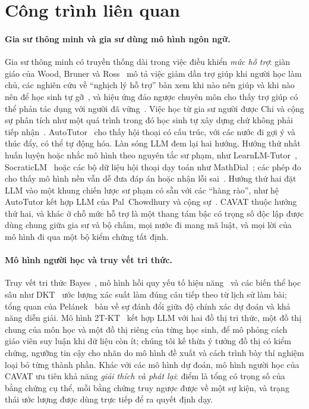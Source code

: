 \section{Công trình liên quan}\label{sec:related}

\paragraph{Gia sư thông minh và gia sư dùng mô hình ngôn ngữ.}
Gia sư thông minh có truyền thống dài trong việc điều khiển \emph{mức hỗ trợ}: giàn giáo của Wood, Bruner và Ross~\cite{wood1976} mô tả việc giảm dần trợ giúp khi người học làm chủ, các nghiên cứu về ``nghịch lý hỗ trợ'' bàn xem khi nào nên giúp và khi nào nên để học sinh tự gỡ~\cite{koedinger2007,aleven2016}, và hiệu ứng đảo ngược chuyên môn cho thấy trợ giúp có thể phản tác dụng với người đã vững~\cite{kalyuga2003}. Việc học từ gia sư người được Chi và cộng sự phân tích như một quá trình trong đó học sinh tự xây dựng chứ không phải tiếp nhận~\cite{chi2001}. AutoTutor~\cite{graesser2005} cho thấy hội thoại có cấu trúc, với các nước đi gợi ý và thúc đẩy, có thể tự động hóa. Làn sóng LLM đem lại hai hướng. Hướng thứ nhất huấn luyện hoặc nhắc mô hình theo nguyên tắc sư phạm, như LearnLM-Tutor~\cite{jurenka2024}, SocraticLM~\cite{liu2024socratic} hoặc các bộ dữ liệu hội thoại dạy toán như MathDial~\cite{macina2023}; các phép đo cho thấy mô hình nền vẫn dễ đưa đáp án hoặc nhận lỗi sai~\cite{macina2023,tack2022}. Hướng thứ hai đặt LLM vào một khung chiến lược sư phạm có sẵn với các ``hàng rào'', như hệ AutoTutor kết hợp LLM của Pal~Chowdhury và cộng sự~\cite{chowdhury2024}. CAVAT thuộc hướng thứ hai, và khác ở chỗ mức hỗ trợ là một thang tám bậc có trọng số độc lập được dùng chung giữa gia sư và bộ chấm, mọi nước đi mang mã luật, và mọi lời của mô hình đi qua một bộ kiểm chứng tất định.

\paragraph{Mô hình người học và truy vết tri thức.}
Truy vết tri thức Bayes~\cite{corbett1995}, mô hình hồi quy yếu tố hiệu năng~\cite{pavlik2009} và các biến thể học sâu như DKT~\cite{piech2015} ước lượng xác suất làm đúng câu tiếp theo từ lịch sử làm bài; tổng quan của Pelánek~\cite{pelanek2017} bàn về sự đánh đổi giữa độ chính xác dự đoán và khả năng diễn giải. Mô hình 2T-KT~\cite{li2026} kết hợp LLM với hai đồ thị tri thức, một đồ thị chung của môn học và một đồ thị riêng của từng học sinh, để mô phỏng cách giáo viên suy luận khi dữ liệu còn ít; chúng tôi kế thừa ý tưởng đồ thị có kiểm chứng, ngưỡng tin cậy cho nhãn do mô hình đề xuất và cách trình bày thí nghiệm loại bỏ từng thành phần. Khác với các mô hình dự đoán, mô hình người học của CAVAT ưu tiên khả năng \emph{giải thích và phát lại}: điểm là tổng có trọng số của bằng chứng cụ thể, mỗi bằng chứng truy ngược được về một sự kiện, và trạng thái ước lượng được dùng trực tiếp để ra quyết định dạy.

